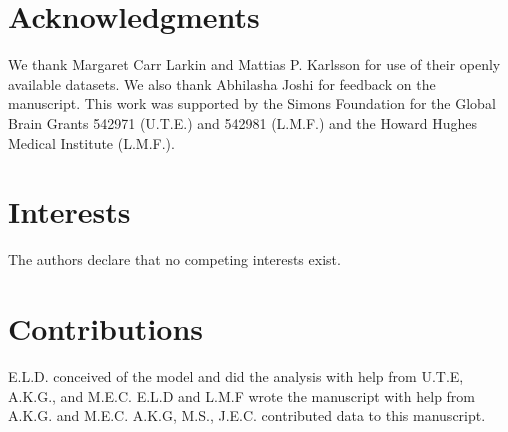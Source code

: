 \documentclass[9pt,lineno]{elife}
\begin{document}
\section{Acknowledgments}
We thank Margaret Carr Larkin and Mattias P. Karlsson for use of their openly available datasets. We also thank Abhilasha Joshi for feedback on the manuscript. This work was supported by the Simons Foundation for the Global Brain Grants 542971 (U.T.E.) and 542981 (L.M.F.) and the Howard Hughes Medical Institute (L.M.F.).

\section{Interests}
The authors declare that no competing interests exist.

\section{Contributions}
E.L.D. conceived of the model and did the analysis with help from U.T.E, A.K.G., and M.E.C. E.L.D and L.M.F wrote the manuscript with help from A.K.G. and M.E.C. A.K.G, M.S., J.E.C. contributed data to this manuscript.


\end{document}
